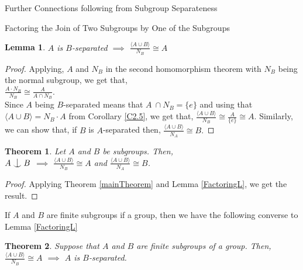 \documentclass{article}
\newtheorem{theorem}{Theorem}[section]
\newtheorem{lemma}{Lemma}[section]
\def\indep{\mathrel{\raise0.2ex\hbox{\ooalign{\hidewidth$\vert$\hidewidth\cr\raise-0.9ex\hbox{$\smile$}}}}}
\begin{document}
\begin{section}{Further Connections following from Subgroup Separateness}
\begin{subsection}{Factoring the Join of Two Subgroups by One of the Subgroups}
\begin{lemma}
				$A$ is $B$-separated $\implies$ 	\large{$\frac{\langle  A\cup B\rangle }{N_B } \cong A$} 
				
			\end{lemma}
			
			\begin{proof}
				Applying, $A$ and $N_B $  in the second homomorphism theorem with $N_B $ being the normal subgroup, we get that, \\
				
				{\large	$\frac{A \cdot N_B }{N_B} \cong \frac{A}{A \cap N_B }$.}\\
				
				Since $A$ being $B$-separated means that $A \  \cap N_B  = \{e\}$ and using that $\langle  A \cup B\rangle  = N_B  \cdot A$ from Corollary \ref{C2.5}, we get that,
				{\large $\frac{\langle  A\cup B\rangle }{N_B } \cong \frac{A}{\{e\}} \cong A$}. Similarly, we can  show that, if $B$ is $A$-separated then,
				$\frac{\langle  A\cup B\rangle }{N_A} \cong B.$
			\end{proof}	
			
			\begin{theorem}\label{FactoringT}
				Let $A$ and $B$ be subgroups. Then, \\
				
				$A \indep B$ $\implies$ 	\large{$\frac{\langle  A\cup B\rangle }{N_B} \cong A$} \normalsize{and}  \large{$\frac{\langle  A\cup B\rangle }{N_A } \cong B$.}
				
			\end{theorem}
			
			\begin{proof}
				
				Applying Theorem \ref{mainTheorem} and Lemma \ref{FactoringL}, we get the result.
			\end{proof}
			
			\noindent If $A$ and $B$ are finite subgroups if a group, then we have the following converse to Lemma \ref{FactoringL}
			
			\begin{theorem}\label{T3.2}
				Suppose that  $A$ and $B$ are finite subgroups of a group. Then, \\
				
				{\large $\frac{\langle  A\cup B\rangle }{N_B } \cong A$} $\implies$  $A$ is $B$-separated.
				
			\end{theorem}
			

\end{subsection}
\end{section}
\end{document}
